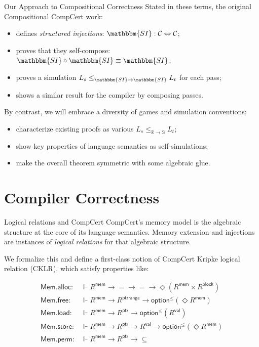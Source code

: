 \documentclass{beamer}
\newcommand{\kw}[1]{\ensuremath{ \mathsf{#1} }}
\begin{document}
\begin{frame}{Our Approach to Compositional Correctness} %
Stated in these terms,
the original Compositional CompCert work:
\begin{itemize}
\item defines \emph{structured injections}: $\mathbbm{SI} : \mathcal{C} \Leftrightarrow \mathcal{C}$;
\item proves that they self-compose: $\mathbbm{SI} \circ \mathbbm{SI} \equiv \mathbbm{SI}$;
\item proves a simulation $L_s \le_{\mathbbm{SI} \rightarrow \mathbbm{SI}} L_t$ for each pass;
\item shows a similar result for the compiler by composing passes.
\end{itemize}

\vspace{1ex}
By contrast,
we will embrace a diversity of games and simulation conventions:
\begin{itemize}
\item characterize existing proofs as various $L_s \le_{\mathbb{R} \rightarrow \mathbb{S}} L_t$;
\item show key properties of language semantics as self-simulations;
\item make the overall theorem symmetric with some algebraic glue.
\end{itemize}

\end{frame}

\section{Compiler Correctness}

\begin{frame}{Logical relations and CompCert} %
CompCert's memory model
is the algebraic structure at the core of
its language semantics.
Memory extension and injections
are instances of \emph{logical relations}
for that algebraic structure.

\vspace{1em}
We formalize this and define a first-class notion of
CompCert Kripke logical relation (CKLR),
which satisfy properties like:

\begin{align*}
    \kw{Mem.alloc} :
      &\Vdash R^\kw{mem} \rightarrow {=} \rightarrow {=} \rightarrow
      \Diamond (R^\kw{mem} \times R^\kw{block})
    \\
    \kw{Mem.free} :
      &\Vdash R^\kw{mem} \rightarrow R^\kw{ptrrange} \rightarrow
      \kw{option}^\le(\Diamond R^\kw{mem})
    \\
    \kw{Mem.load} :
      &\Vdash R^\kw{mem} \rightarrow R^\kw{ptr} \rightarrow
      \kw{option}^\le(R^\kw{val})
    \\
    \kw{Mem.store} :
      &\Vdash R^\kw{mem} \rightarrow R^\kw{ptr} \rightarrow R^\kw{val} \rightarrow
      \kw{option}^\le(\Diamond R^\kw{mem})
    \\
    \kw{Mem.perm} :
      &\Vdash R^\kw{mem} \rightarrow R^\kw{ptr} \rightarrow {\subseteq}
\end{align*}
\end{frame}
\end{document}
